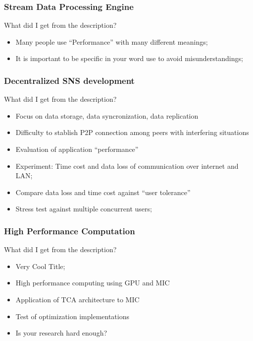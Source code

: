 \documentclass[10pt]{beamer}
\begin{document}
\begin{frame}
  \frametitle{Stream Data Processing Engine}
  \begin{block}{What did I get from the description?}
    \begin{itemize}
    \item Many people use ``Performance'' with many different
      meanings;
    \item It is important to be specific in your word use to avoid
      misunderstandings;
    \end{itemize}
  \end{block}
\end{frame}

\begin{frame}
  \frametitle{Decentralized SNS development}
  \begin{block}{What did I get from the description?}
    \begin{itemize}
    \item Focus on data storage, data syncronization, data replication
    \item Difficulty to stablish P2P connection among peers with
      interfering situations
    \item Evaluation of application ``performance''
    \item Experiment: Time cost and data loss of communication over
      internet and LAN;
    \item Compare data loss and time cost against ``user tolerance''
    \item Stress test against multiple concurrent users;
    \end{itemize}
  \end{block}
\end{frame}

\begin{frame}
  \frametitle{High Performance Computation}
  \begin{block}{What did I get from the description?}
    \begin{itemize}
    \item Very Cool Title;
    \item High performance computing using GPU and MIC
    \item Application of TCA architecture to MIC
    \item Test of optimization implementations
    \item Is your research hard enough?
    \end{itemize}
  \end{block}
\end{frame}
\end{document}
